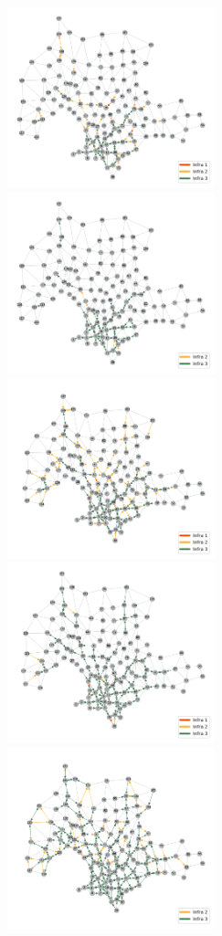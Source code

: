\documentclass{article}
\begin{document}
  \begin{figure}[h!]
    \centering
    \includegraphics[width=6cm]{../resources/montevideo_d5000.0_linear_0.4_budget_factor.png}
    \includegraphics[width=6cm]{../resources/montevideo_d5000.0_inv_logit_0.4_budget_factor.png}
    \includegraphics[width=6cm]{../resources/montevideo_d5000.0_linear.png}
    \includegraphics[width=6cm]{../resources/montevideo_d5000.0_inv_logit.png}
    \includegraphics[width=6cm]{../resources/montevideo_d5000.0_linear_1.6_budget_factor.png}

\end{figure}
\end{document}
